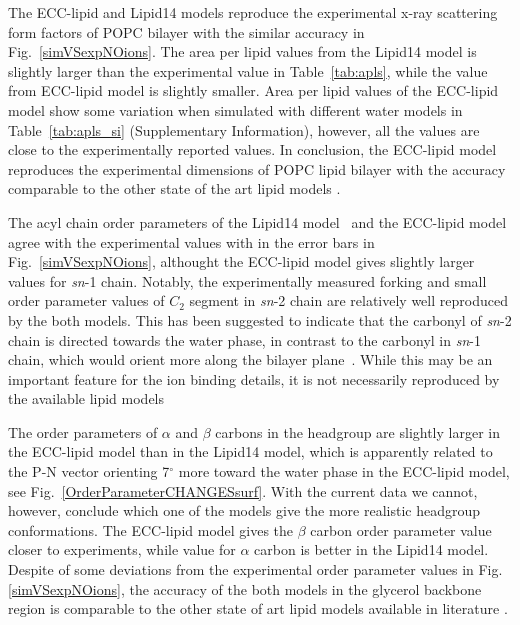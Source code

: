 \documentclass[aip,jcp,twocolumn]{revtex4}
\begin{document}
The ECC-lipid and Lipid14 models reproduce the experimental x-ray scattering form factors
of POPC bilayer with the similar accuracy in Fig.~\ref{simVSexpNOions}.
The area per lipid values from the Lipid14 model is slightly larger than the
experimental value in Table~\ref{tab:apls}, while the value from ECC-lipid model
is slightly smaller. Area per lipid values of the ECC-lipid model show some variation
when simulated with different water models in Table~\ref{tab:apls_si} (Supplementary Information),
however, all the values are close to the experimentally reported values.
In conclusion, the ECC-lipid model reproduces the experimental dimensions of POPC
lipid bilayer with the accuracy comparable to the other state of the art lipid models \cite{ollila16}.

The acyl chain order parameters of the Lipid14 model~\cite{dickson14} and the
ECC-lipid model agree with the experimental values with in the error bars
in Fig.~\ref{simVSexpNOions}, althought the ECC-lipid model gives slightly larger
values for {\it sn}-1 chain. Notably, the experimentally measured forking and
small order parameter values of $C_2$ segment in {\it sn}-2 chain are relatively well
reproduced by the both models. This has been suggested to indicate that the carbonyl
of {\it sn}-2 chain is directed towards the water phase, in contrast to the
carbonyl in {\it sn}-1 chain, which would orient more along the bilayer
plane~\cite{seelig75,schindler75,gawrisch92}. While this may be an important
feature for the ion binding details, it is not necessarily reproduced by the
available lipid models~\cite{ollila16}

The order parameters of $\alpha$ and $\beta$ carbons in the headgroup are slightly larger
in the ECC-lipid model than in the Lipid14 model, which is apparently related to the
P-N vector orienting 7$^{\circ}$ more toward the water phase in the ECC-lipid model, 
see Fig.~\ref{OrderParameterCHANGESsurf}. With the current data we cannot,
however, conclude which one of the models give the more realistic
headgroup conformations. The ECC-lipid model gives
the $\beta$ carbon order parameter value closer to experiments, while
value for $\alpha$ carbon is better in the Lipid14 model.
Despite of some deviations from the experimental order parameter values
in Fig. \ref{simVSexpNOions},
the accuracy of the both models in the glycerol backbone region
is comparable to the other state
of art lipid models available in literature \cite{botan15}.
\end{document}
